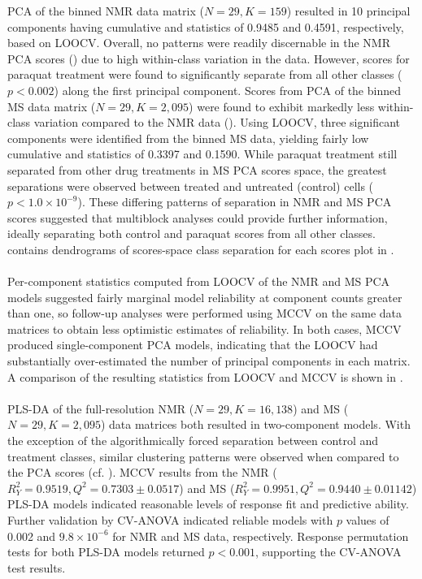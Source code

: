 \begin{doublespace}
PCA of the binned NMR data matrix ($N = 29, K = 159$) resulted in 10 principal
components having cumulative \rsqx{} and \qsq{} statistics of 0.9485 and
0.4591, respectively, based on LOOCV. Overall, no patterns were readily
discernable in the NMR PCA scores () due to high
within-class variation in the data. However, scores for paraquat treatment
were found to significantly separate from all other classes ($p < 0.002$)
along the first principal component. Scores from PCA of the binned MS data
matrix ($N = 29, K = 2,095$) were found to exhibit markedly less within-class
variation compared to the NMR data (). Using LOOCV,
three significant components were identified from the binned MS data, yielding
fairly low cumulative \rsqx{} and \qsq{} statistics of 0.3397 and 0.1590.
While paraquat treatment still separated from other drug treatments in MS
PCA scores space, the greatest separations were observed between treated
and untreated (control) cells ($p < 1.0 \times 10^{-9}$). These differing
patterns of separation in NMR and MS PCA scores suggested that multiblock
analyses could provide further information, ideally separating both control
and paraquat scores from all other classes.  contains
dendrograms of scores-space class separation for each scores plot in
.
\\\\
Per-component \qsq{} statistics computed from LOOCV of the NMR and MS PCA
models suggested fairly marginal model reliability at component counts greater
than one, so follow-up analyses were performed using MCCV on the same data
matrices to obtain less optimistic estimates of reliability. In both cases,
MCCV produced single-component PCA models, indicating that the LOOCV had
substantially over-estimated the number of principal components in each
matrix. A comparison of the resulting \qsq{} statistics from LOOCV and MCCV
is shown in .
\\\\
PLS-DA of the full-resolution NMR ($N = 29, K = 16,138$) and
MS ($N = 29, K = 2,095$) data matrices both resulted in two-component models.
With the exception of the algorithmically forced separation between control
and treatment classes, similar clustering patterns were observed when compared
to the PCA scores (cf. ). MCCV results from the
NMR ($R^2_Y = 0.9519, Q^2 = 0.7303 \pm 0.0517$) and
MS ($R^2_Y = 0.9951, Q^2 = 0.9440 \pm 0.01142$) PLS-DA models indicated
reasonable levels of response fit and predictive ability. Further validation
by CV-ANOVA \cite{eriksson:jchemo2008} indicated reliable models with $p$
values of 0.002 and $9.8 \times 10^{-6}$ for NMR and MS data, respectively.
Response permutation tests for both PLS-DA models returned $p < 0.001$,
supporting the CV-ANOVA test results.
\end{doublespace}

